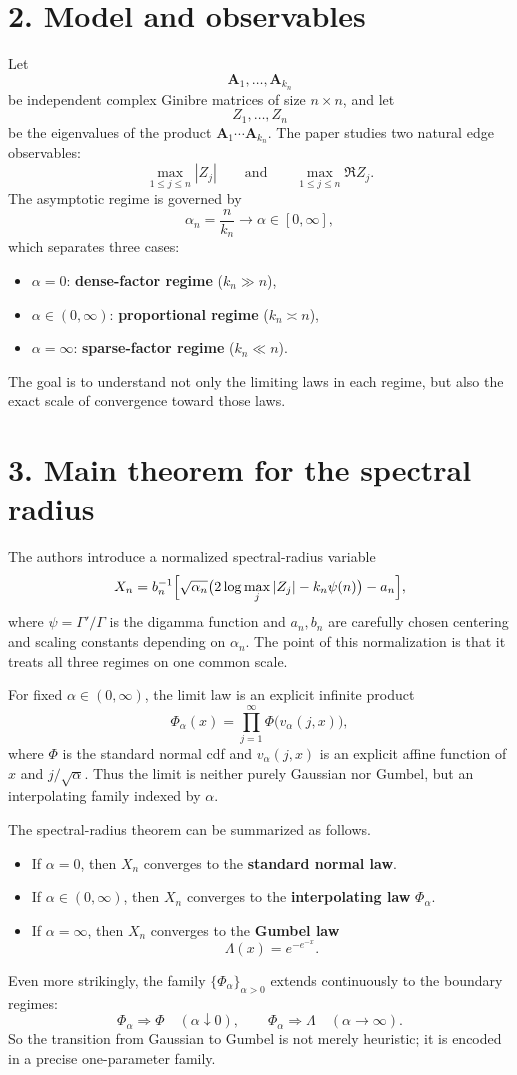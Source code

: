 \documentclass[11pt]{article}
\begin{document}
\section*{2. Model and observables}
Let
\[
\mathbf A_1,\dots,\mathbf A_{k_n}
\]
be independent complex Ginibre matrices of size $n\times n$, and let
\[
Z_1,\dots,Z_n
\]
be the eigenvalues of the product $\mathbf A_1\cdots \mathbf A_{k_n}$. The paper studies two natural edge observables:
\[
\max_{1\le j\le n}|Z_j| \qquad\text{and}\qquad \max_{1\le j\le n}\Re Z_j.
\]
The asymptotic regime is governed by
\[
\alpha_n=\frac{n}{k_n}\to \alpha\in[0,\infty],
\]
which separates three cases:
\begin{itemize}[leftmargin=1.5em]
\item $\alpha=0$: \textbf{dense-factor regime} ($k_n\gg n$),
\item $\alpha\in(0,\infty)$: \textbf{proportional regime} ($k_n\asymp n$),
\item $\alpha=\infty$: \textbf{sparse-factor regime} ($k_n\ll n$).
\end{itemize}
The goal is to understand not only the limiting laws in each regime, but also the exact scale of convergence toward those laws.

\section*{3. Main theorem for the spectral radius}
The authors introduce a normalized spectral-radius variable
\[
X_n=b_n^{-1}\Bigl[\sqrt{\alpha_n}\bigl(2\log\max_j |Z_j|-k_n\psi(n)\bigr)-a_n\Bigr],
\]
where $\psi=\Gamma'/\Gamma$ is the digamma function and $a_n,b_n$ are carefully chosen centering and scaling constants depending on $\alpha_n$. The point of this normalization is that it treats all three regimes on one common scale.

For fixed $\alpha\in(0,\infty)$, the limit law is an explicit infinite product
\[
\Phi_\alpha(x)=\prod_{j=1}^{\infty}\Phi\bigl(v_\alpha(j,x)\bigr),
\]
where $\Phi$ is the standard normal cdf and $v_\alpha(j,x)$ is an explicit affine function of $x$ and $j/\sqrt\alpha$. Thus the limit is neither purely Gaussian nor Gumbel, but an interpolating family indexed by $\alpha$.

The spectral-radius theorem can be summarized as follows.
\begin{itemize}[leftmargin=1.5em]
\item If $\alpha=0$, then $X_n$ converges to the \textbf{standard normal law}.
\item If $\alpha\in(0,\infty)$, then $X_n$ converges to the \textbf{interpolating law} $\Phi_\alpha$.
\item If $\alpha=\infty$, then $X_n$ converges to the \textbf{Gumbel law}
\[
\Lambda(x)=e^{-e^{-x}}.
\]
\end{itemize}
Even more strikingly, the family $\{\Phi_\alpha\}_{\alpha>0}$ extends continuously to the boundary regimes:
\[
\Phi_\alpha \Longrightarrow \Phi \quad (\alpha\downarrow 0),
\qquad
\Phi_\alpha \Longrightarrow \Lambda \quad (\alpha\to\infty).
\]
So the transition from Gaussian to Gumbel is not merely heuristic; it is encoded in a precise one-parameter family.
\end{document}

